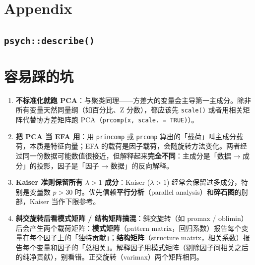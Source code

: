 \documentclass[
]{ctexart}
\begin{document}
\hypertarget{appendix}{%
\section{Appendix}\label{appendix}}

\hypertarget{psychdescribe}{%
\subsection{\texorpdfstring{\texttt{psych::describe()}}{psych::describe()}}\label{psychdescribe}}

\hypertarget{ux5bb9ux6613ux8e29ux7684ux5751}{%
\section{容易踩的坑}\label{ux5bb9ux6613ux8e29ux7684ux5751}}

\begin{pitfall}
\begin{enumerate}
\item \textbf{不标准化就跑 PCA}：与聚类同理——方差大的变量会主导第一主成分。除非所有变量天然同量纲（如百分比、Z 分数），都应该先 \texttt{scale()} 或者用相关矩阵代替协方差矩阵跑 PCA（\texttt{prcomp(x, scale. = TRUE)}）。
\item \textbf{把 PCA 当 EFA 用}：用 \texttt{princomp} 或 \texttt{prcomp} 算出的「载荷」叫主成分载荷，本质是特征向量；EFA 的载荷是因子载荷，会随旋转方法变化。两者经过同一份数据可能数值很接近，但解释起来\textbf{完全不同}：主成分是「数据 → 成分」的投影，因子是「因子 → 数据」的反向解释。
\item \textbf{Kaiser 准则保留所有 $\lambda > 1$ 成分}：Kaiser ($\lambda > 1$) 经常会保留过多成分，特别是变量数 $p > 30$ 时。优先信赖\textbf{平行分析}（parallel analysis）和\textbf{碎石图}的肘部，Kaiser 当作下限参考。
\item \textbf{斜交旋转后看模式矩阵 / 结构矩阵搞混}：斜交旋转（如 promax / oblimin）后会产生两个载荷矩阵：\textbf{模式矩阵}（pattern matrix，回归系数）报告每个变量在每个因子上的「独特贡献」；\textbf{结构矩阵}（structure matrix，相关系数）报告每个变量和因子的「总相关」。解释因子用模式矩阵（剔除因子间相关之后的纯净贡献），别看错。正交旋转（varimax）两个矩阵相同。
\end{enumerate}
\end{pitfall}
\end{document}
